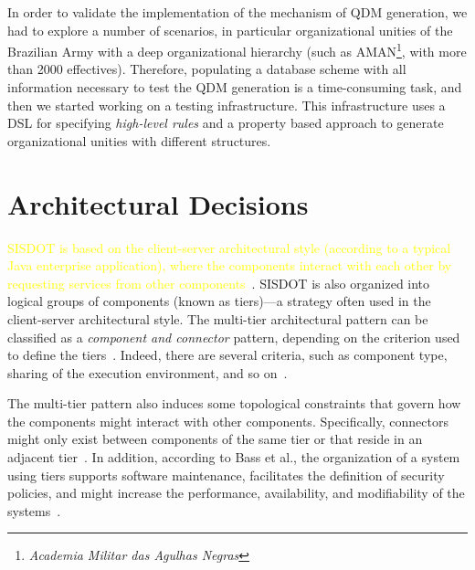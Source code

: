 \documentclass[AMA,STIX1COL]{WileyNJD-v2}
\newcommand{\callers}{\emph{high-level rules}\xspace}
\begin{document}
In order to validate the implementation of
the mechanism of QDM generation, we had to
explore a number of scenarios, in particular
organizational unities of the Brazilian Army
with a deep organizational hierarchy (such as
AMAN\footnote{\emph{Academia Militar das Agulhas Negras}},
with more than 2000 effectives). Therefore, populating
a database scheme with all information necessary
to test the QDM generation is a time-consuming task,
and then we started working on a testing infrastructure.
This infrastructure uses a DSL for specifying \callers and
a property based approach to generate organizational
unities with different structures. 




\section{Architectural Decisions}
\label{sec:architecture} 

\textcolor{yellow}{SISDOT is based on the client-server architectural style (according to a typical Java enterprise application), where the components interact with each other by requesting services from other components}~\cite{clements2011documenting}. SISDOT is also organized into logical groups of components (known as tiers)---a strategy often used in the client-server architectural style. The multi-tier architectural pattern can be classified as a \emph{component and connector} pattern, depending on the criterion used to define the tiers~\cite{bass2013software}. Indeed, there are several criteria, such as component type, sharing of the execution environment, 
and so on~\cite{clements2011documenting}.

The multi-tier pattern also induces some topological constraints that govern how the components might interact with other components. Specifically, connectors might only exist between components of the same tier or that reside in an adjacent tier~\cite{clements2011documenting}. In addition, according to Bass et al., the organization of a system using tiers supports software maintenance, facilitates the definition of security policies, and might increase the performance, availability, and modifiability of the systems~\cite{bass2013software}. 
\end{document}
